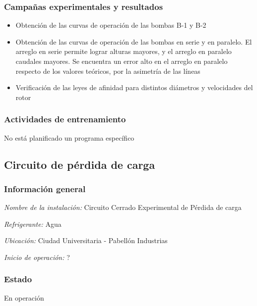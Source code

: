 \documentclass{article}
\begin{document}
\subsubsection*{Campañas experimentales y resultados}
\begin{itemize}
    \item Obtención de las curvas de operación de las bombas B-1 y B-2
    \item Obtención de las curvas de operación de las bombas en serie y en paralelo. El arreglo en serie permite lograr alturas mayores, y el arreglo en paralelo caudales mayores. Se encuentra un error alto en el arreglo en paralelo respecto de los valores teóricos, por la asimetría de las líneas
    \item Verificación de las leyes de afinidad para distintos diámetros y velocidades del rotor
\end{itemize}

\subsubsection*{Actividades de entrenamiento}
No está planificado un programa específico
\newpage
\subsection{Circuito de pérdida de carga}
\subsubsection*{Información general}
\textit{Nombre de la instalación: }Circuito Cerrado Experimental de Pérdida de carga

\textit{Refrigerante: }Agua

\textit{Ubicación: }Ciudad Universitaria - Pabellón Industrias

\textit{Inicio de operación: }?

\subsubsection*{Estado}
En operación
\end{document}
